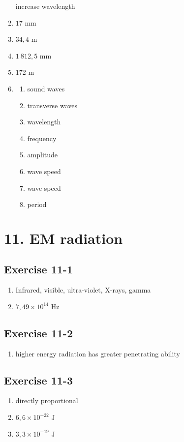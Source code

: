 \begin{multicols}{5}
\begin{enumerate}[itemsep=5pt, label=\textbf{\arabic*}. ]
increase wavelength
\item %
$17 \text{ mm}$
\item %
$34,4 \text{ m}$
\item %
$1~812,5 \text{ mm}$
\item %
$172 \text{ m}$
\item %
    \begin{enumerate}[noitemsep, label=\textbf{(\alph*)} ]
    \item sound waves
    \item transverse waves
\item wavelength
\item frequency
    \item amplitude
    \item wave speed
\item wave speed
\item period
    \end{enumerate}
  \end{enumerate}
\end{multicols}

\section {11. EM radiation}
\subsection{Exercise 11-1}     
\begin{enumerate}[noitemsep, label=\textbf{\arabic*}.]
\item Infrared, visible, ultra-violet, X-rays, gamma 
\item $7,49 \times 10^{14} \text{ Hz}$
\end{enumerate}

\subsection{Exercise 11-2} 
 \begin{enumerate}[noitemsep, label=\textbf{\arabic*}. ]
  \item higher energy radiation has greater penetrating ability
\end{enumerate}

\subsection{Exercise 11-3}
\begin{multicols}{3}
  \begin{enumerate}[noitemsep, label=\textbf{\arabic*}. ]
 \item directly proportional
\item $6,6 \times 10^{-22} \text{ J}$
\item $3,3 \times 10^{-19} \text{ J}$
\end{enumerate}
\end{multicols}

